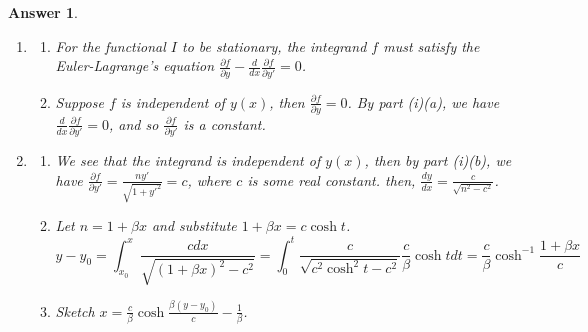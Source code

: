 \documentclass[a4paper]{article}
\newtheorem{ans}{Answer}[section]
\theoremstyle{new}
\begin{document}
\begin{ans}\leavevmode
\begin{enumerate}[label=(\roman*)]
\item 
\begin{enumerate}[label=(\alph*)]
\item For the functional $I$ to be stationary, the integrand $f$ must satisfy the Euler-Lagrange's equation $\frac{\partial f}{\partial y}-\frac{d}{dx}\frac{\partial f}{\partial y'}=0$.
\item Suppose $f$ is independent of $y(x)$, then $\frac{\partial f}{\partial y}=0$. By part (i)(a), we have $\frac{d}{dx}\frac{\partial f}{\partial y'}=0$, and so $\frac{\partial f}{\partial y'}$ is a constant.
\end{enumerate}
\item
\begin{enumerate}[label=(\alph*)]
\item We see that the integrand is independent of $y(x)$, then by part (i)(b), we have $\frac{\partial f}{\partial y'}=\frac{ny'}{\sqrt{1+y'^2}}=c$, where $c$ is some real constant. then, $\frac{dy}{dx}=\frac{c}{\sqrt{n^2-c^2}}$.
\item Let $n=1+\beta x$ and substitute $1+\beta x=c\cosh t$.
$$y-y_0=\int_{x_0}^x\frac{cdx}{\sqrt{(1+\beta x)^2-c^2}}=\int_0^t\frac{c}{\sqrt{c^2\cosh^2t-c^2}}\frac{c}{\beta}\cosh tdt=\frac{c}{\beta}\cosh^{-1}\frac{1+\beta x}{c}$$
\item Sketch $x=\frac{c}{\beta}\cosh\frac{\beta(y-y_0)}{c}-\frac{1}{\beta}$.
\end{enumerate}
\end{enumerate}
\begin{center}
\end{center}
\end{ans}
\end{document}
